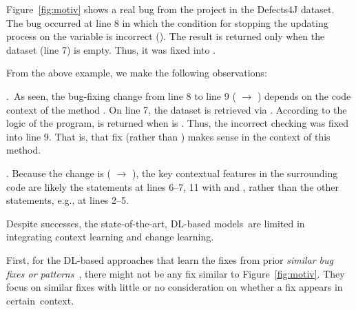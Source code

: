 Figure~\ref{fig:motiv} shows a real bug from the project 
in the Defects4J dataset. The bug occurred at line 8 in which the
condition for stopping the updating process on the 
variable is incorrect (). The result is
returned only when the dataset (line 7) is empty. Thus, it was fixed
into .

From the above example, we make the following observations:

.~As
seen, the bug-fixing change from line 8 to line 9 ( $\rightarrow$ ) depends on the
code context of the method . On line 7, the
dataset is retrieved via . According to the logic of
the program,  is returned when  is
.  Thus, the incorrect checking was fixed into line 9. That
is, that fix  (rather than ) makes sense in the context of this method.


\vspace{2pt}
.
Because the change is ( \code{!=} 
$\rightarrow$  \code{==} ), the key
contextual features in the surrounding code are likely the statements
at lines 6--7, 11 with  and , rather
than the other statements, e.g., at lines 2--5.


Despite successes, the state-of-the-art, DL-based models~are
limited in integrating context learning and change learning.

First, for the DL-based approaches that learn the fixes
from prior {\em similar bug fixes or
  patterns}~\cite{gupta2017deepfix,white2019sorting,white2016deep},
there might not be any fix similar to Figure~\ref{fig:motiv}. They focus
on similar fixes with little or no consideration on whether a fix
appears in certain~context.

